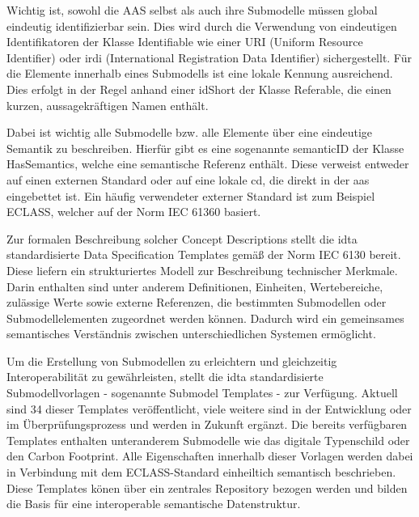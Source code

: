 Wichtig ist, sowohl die AAS selbst als auch ihre Submodelle müssen global eindeutig identifizierbar sein.
Dies wird durch die Verwendung von eindeutigen Identifikatoren der Klasse Identifiable wie einer URI (Uniform Resource Identifier) oder \acs{irdi} (International Registration Data Identifier) sichergestellt.
Für die Elemente innerhalb eines Submodells ist eine lokale Kennung ausreichend. Dies erfolgt in der Regel anhand einer idShort der Klasse Referable, die einen kurzen, aussagekräftigen Namen enthält.

Dabei ist wichtig alle Submodelle bzw. alle Elemente über eine eindeutige Semantik zu beschreiben.
Hierfür gibt es eine sogenannte semanticID der Klasse HasSemantics, welche eine semantische Referenz enthält.
Diese verweist entweder auf einen externen Standard oder auf eine lokale \ac{cd}, die direkt in der \acs{aas} eingebettet ist.
Ein häufig verwendeter externer Standard ist zum Beispiel ECLASS, welcher auf der Norm IEC 61360 \cite{ECLASSIEC61360} basiert.

Zur formalen Beschreibung solcher Concept Descriptions stellt die \acs{idta} standardisierte Data Specification Templates gemäß der Norm IEC 6130 \cite{SpezifikationPart3a} bereit.
Diese liefern ein strukturiertes Modell zur Beschreibung technischer Merkmale.
Darin enthalten sind unter anderem Definitionen, Einheiten, Wertebereiche, zulässige Werte sowie externe Referenzen, die bestimmten Submodellen oder Submodellelementen zugeordnet werden können.
Dadurch wird ein gemeinsames semantisches Verständnis zwischen unterschiedlichen Systemen ermöglicht.


Um die Erstellung von Submodellen zu erleichtern und gleichzeitig Interoperabilität zu gewährleisten, stellt die \acs{idta} standardisierte Submodellvorlagen - sogenannte Submodel Templates - zur Verfügung.
Aktuell sind 34 dieser Templates veröffentlicht, viele weitere sind in der Entwicklung oder im Überprüfungsprozess und werden in Zukunft ergänzt.
Die bereits verfügbaren Templates enthalten unteranderem Submodelle wie das digitale Typenschild oder den Carbon Footprint.
Alle Eigenschaften innerhalb dieser Vorlagen werden dabei in Verbindung mit dem ECLASS-Standard einheiltich semantisch beschrieben.
Diese Templates könen über ein zentrales Repository \cite{idtaTemplates} bezogen werden und bilden die Basis für eine interoperable semantische Datenstruktur.

